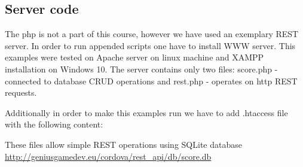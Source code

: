  \subsection{Server code}
 The php is not a part of this course, however we have used an exemplary REST server. In order to run appended scripts one have to install WWW server. This examples were tested on Apache server on linux machine and XAMPP installation on Windows 10. The server contains only two files: score.php - connected to database CRUD operations and rest.php - operates on http REST requests.



 Additionally in order to make this examples run we have to add .htaccess file with the following content:


 These files allow simple REST operations using SQLite database \url{http://geniusgamedev.eu/cordova/rest_api/db/score.db}


